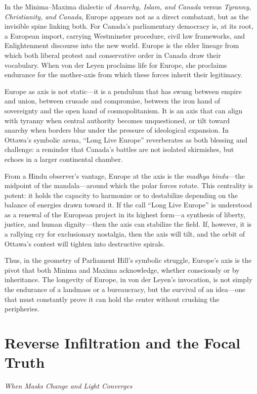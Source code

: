\documentclass[12pt]{article}
\begin{document}
In the Minima–Maxima dialectic of \textit{Anarchy, Islam, and Canada} versus \textit{Tyranny, Christianity, and Canada}, Europe appears not as a direct combatant, but as the invisible spine linking both. For Canada’s parliamentary democracy is, at its root, a European import, carrying Westminster procedure, civil law frameworks, and Enlightenment discourse into the new world. Europe is the elder lineage from which both liberal protest and conservative order in Canada draw their vocabulary. When von der Leyen proclaims life for Europe, she proclaims endurance for the mother-axis from which these forces inherit their legitimacy.

Europe as axis is not static—it is a pendulum that has swung between empire and union, between crusade and compromise, between the iron hand of sovereignty and the open hand of cosmopolitanism. It is an axis that can align with tyranny when central authority becomes unquestioned, or tilt toward anarchy when borders blur under the pressure of ideological expansion. In Ottawa’s symbolic arena, ``Long Live Europe'' reverberates as both blessing and challenge: a reminder that Canada’s battles are not isolated skirmishes, but echoes in a larger continental chamber.

From a Hindu observer’s vantage, Europe at the axis is the \textit{madhya bindu}—the midpoint of the mandala—around which the polar forces rotate. This centrality is potent: it holds the capacity to harmonize or to destabilize depending on the balance of energies drawn toward it. If the call ``Long Live Europe'' is understood as a renewal of the European project in its highest form—a synthesis of liberty, justice, and human dignity—then the axis can stabilize the field. If, however, it is a rallying cry for exclusionary nostalgia, then the axis will tilt, and the orbit of Ottawa’s contest will tighten into destructive spirals.

Thus, in the geometry of Parliament Hill’s symbolic struggle, Europe’s axis is the pivot that both Minima and Maxima acknowledge, whether consciously or by inheritance. The longevity of Europe, in von der Leyen’s invocation, is not simply the endurance of a landmass or a bureaucracy, but the survival of an idea—one that must constantly prove it can hold the center without crushing the peripheries.

\newpage
\section*{Reverse Infiltration and the Focal Truth}
\noindent\textit{When Masks Change and Light Converges}
\end{document}
